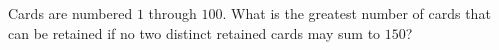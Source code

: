 Cards are numbered $1$ through $100$. What is the greatest number of cards that can be retained if no two distinct retained cards may sum to $150$?
